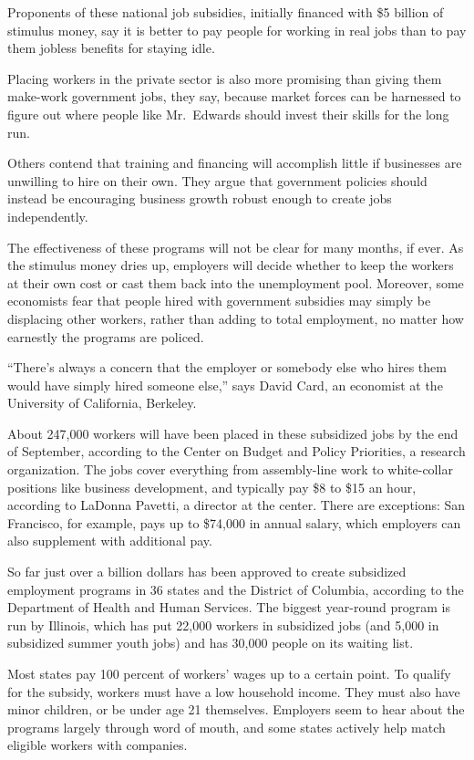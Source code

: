 ﻿\documentclass[12pt]{article}
\begin{document}
Proponents of these national job subsidies, initially financed with \$5 billion of stimulus money,
say it is better to pay people for working in real jobs than to pay them jobless benefits for
staying idle.

Placing workers in the private sector is also more promising than giving them make-work government
jobs, they say, because market forces can be harnessed to figure out where people like Mr.~Edwards
should invest their skills for the long run.

Others contend that training and financing will accomplish little if businesses are unwilling to
hire on their own. They argue that government policies should instead be encouraging business growth
robust enough to create jobs independently.

The effectiveness of these programs will not be clear for many months, if ever. As the stimulus
money dries up, employers will decide whether to keep the workers at their own cost or cast them
back into the unemployment pool. Moreover, some economists fear that people hired with government
subsidies may simply be displacing other workers, rather than adding to total employment, no matter
how earnestly the programs are policed.

``There's always a concern that the employer or somebody else who hires them would have simply hired
someone else,'' says David Card, an economist at the University of California, Berkeley.

About 247,000 workers will have been placed in these subsidized jobs by the end of September,
according to the Center on Budget and Policy Priorities, a research organization. The jobs cover
everything from assembly-line work to white-collar positions like business development, and
typically pay \$8 to \$15 an hour, according to LaDonna Pavetti, a director at the center. There are
exceptions: San Francisco, for example, pays up to \$74,000 in annual salary, which employers can
also supplement with additional pay.

So far just over a billion dollars has been approved to create subsidized employment programs in 36
states and the District of Columbia, according to the Department of Health and Human Services. The
biggest year-round program is run by Illinois, which has put 22,000 workers in subsidized jobs (and
5,000 in subsidized summer youth jobs) and has 30,000 people on its waiting list.

Most states pay 100 percent of workers' wages up to a certain point. To qualify for the subsidy,
workers must have a low household income. They must also have minor children, or be under age 21
themselves. Employers seem to hear about the programs largely through word of mouth, and some states
actively help match eligible workers with companies.
\end{document}
